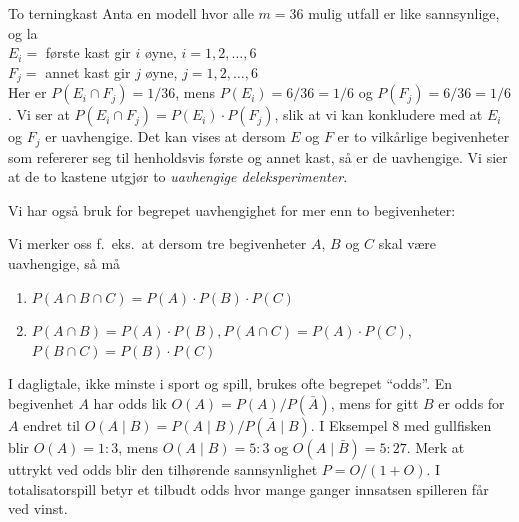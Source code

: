 \begin{eksempel}{To terningkast}
Anta en modell hvor alle $m = 36$ mulig utfall er like
sannsynlige, og la \\[3mm]
\indent     $E_i =$ første kast gir $i$ øyne,    $i = 1,2,\ldots,6$\\
\indent     $F_j =$ annet kast gir $j$ øyne,   $j = 1,2,\ldots,6$ \\[3mm]
Her er $P(E_i \cap F_j)=1/36$, mens $P(E_i)=6/36=1/6$ og $P(F_j)=6/36=1/6$.
Vi ser at $P(E_i \cap F_j)=P(E_i) \cdot P(F_j)$, slik at vi kan
konkludere med at $E_i$ og $F_j$ er uavhengige. Det kan vises at
dersom $E$ og $F$ er to vilkårlige begivenheter som refererer seg
til henholdsvis første og annet kast, så er de uavhengige. Vi sier
at de to kastene utgjør to {\em uavhengige deleksperimenter.}
\end{eksempel}

Vi har også bruk for begrepet uavhengighet for mer enn to
begivenheter:
\begin{center}  \end{center}
Vi merker oss f.\ eks.\ at dersom tre begivenheter $A$, $B$ og $C$
skal være uavhengige, så må
\begin{center}
\begin{enumerate}
\item        $P(A\cap B\cap C)=P(A)\cdot P(B)\cdot P(C)$ 
\item        $P(A\cap B)=P(A)\cdot P(B), P(A\cap C)=P(A)\cdot P(C)$,\\
             $P(B\cap C)=P(B)\cdot P(C)$
\end{enumerate}
\end{center}

I dagligtale, ikke minste i sport og spill, brukes ofte begrepet ``odds''.
En begivenhet $A$ har odds lik $O(A)=P(A)/P(\bar{A})$, mens for gitt $B$ 
er odds for $A$ endret til $O(A\mid B)=P(A\mid B)/P(\bar{A}\mid B)$.
I Eksempel 8 med gullfisken blir $O(A)=1:3$, mens $O(A\mid B)=5:3$ og
$O(A\mid \bar{B})=5:27$. Merk at uttrykt ved odds blir den tilhørende 
sannsynlighet $P=O/(1+O)$. I totalisatorspill betyr et tilbudt odds hvor 
mange ganger innsatsen spilleren får ved vinst.

